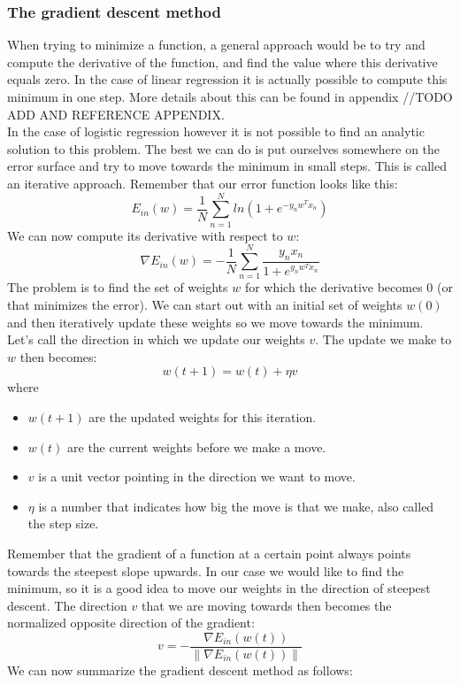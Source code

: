 \subsubsection{The gradient descent method}
When trying to minimize a function, a general approach would be to try and compute the derivative of the function, and find the value where this derivative equals zero. In the case of linear regression it is actually possible to compute this minimum in one step. More details about this can be found in appendix //TODO ADD AND REFERENCE APPENDIX. \\
In the case of logistic regression however it is not possible to find an analytic solution to this problem. The best we can do is put ourselves somewhere on the error surface and try to move towards the minimum in small steps. This is called an iterative approach. Remember that our error function looks like this:
$$
E_{in}(w) = \frac{1}{N}\sum_{n=1}^{N}ln(1+e^{-y_{n}w^{T}x_{n}})
$$
We can now compute its derivative with respect to $w$:
$$
\nabla E_{in}(w) = -\frac{1}{N}\sum_{n=1}^{N}\frac{y_{n}x_{n}}{1+e^{y_{n}w^{T}x_{n}}}
$$
The problem is to find the set of weights $w$ for which the derivative becomes 0 (or that minimizes the error). We can start out with an initial set of weights $w(0)$ and then iteratively update these weights so we move towards the minimum. Let's call the direction in which we update our weights $v$. The update we make to $w$ then becomes:
$$
w(t+1) = w(t) + \eta v
$$
where
\begin{itemize}
	\item $w(t+1)$ are the updated weights for this iteration.
	\item $w(t)$ are the current weights before we make a move.
	\item $v$ is a unit vector pointing in the direction we want to move.
	\item $\eta$ is a number that indicates how big the move is that we make, also called the step size.
\end{itemize}
Remember that the gradient of a function at a certain point always points towards the steepest slope upwards\cite{gradientdirection}\cite{gradientdirection2}. In our case we would like to find the minimum, so it is a good idea to move our weights in the direction of steepest descent. The direction $v$ that we are moving towards then becomes the normalized opposite direction of the gradient:
$$
v = -\frac{\nabla E_{in}(w(t))}{\lVert\nabla E_{in}(w(t))\rVert}
$$
We can now summarize the gradient descent method as follows: \\ \\
